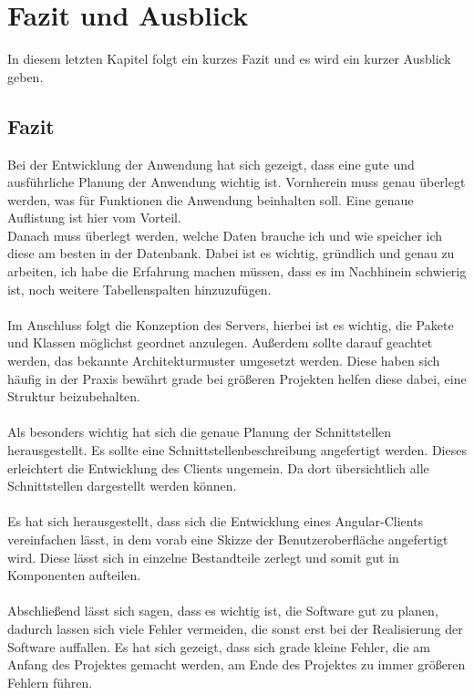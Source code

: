 \section{Fazit und Ausblick}\label{zusammenfassung}

In diesem letzten Kapitel folgt ein kurzes Fazit und es wird ein kurzer Ausblick geben.

\subsection{Fazit}\label{fazit}

Bei der Entwicklung der Anwendung hat sich gezeigt, dass eine gute und ausführliche Planung der Anwendung wichtig ist. Vornherein muss genau überlegt werden, was für Funktionen die Anwendung beinhalten soll. Eine genaue Auflistung ist hier vom Vorteil.
\\
Danach muss überlegt werden, welche Daten brauche ich und wie speicher ich diese am besten in der Datenbank. Dabei ist es wichtig, gründlich und genau zu arbeiten, ich habe die Erfahrung machen müssen, dass es im Nachhinein schwierig ist, noch weitere Tabellenspalten hinzuzufügen.
\\
\\
Im Anschluss folgt die Konzeption des Servers, hierbei ist es wichtig, die Pakete und Klassen möglichst geordnet anzulegen. Außerdem sollte darauf geachtet werden, das bekannte Architekturmuster umgesetzt werden. Diese haben sich häufig in der Praxis bewährt grade bei größeren Projekten helfen diese dabei, eine Struktur beizubehalten.
\\
\\
Als besonders wichtig hat sich die genaue Planung der Schnittstellen herausgestellt. Es sollte eine Schnittstellenbeschreibung angefertigt werden. Dieses erleichtert die Entwicklung des Clients ungemein. Da dort übersichtlich alle Schnittstellen dargestellt werden können.
\\
\\
Es hat sich herausgestellt, dass sich die Entwicklung eines Angular-Clients vereinfachen lässt, in dem vorab eine Skizze der Benutzeroberfläche angefertigt wird. Diese lässt sich in einzelne Bestandteile zerlegt und somit gut in Komponenten aufteilen.
\\
\\
Abschließend lässt sich sagen, dass es wichtig ist, die Software gut zu planen, dadurch lassen sich viele Fehler vermeiden, die sonst erst bei der Realisierung der Software auffallen.
Es hat sich gezeigt, dass sich grade kleine Fehler, die am Anfang des Projektes gemacht werden, am Ende des Projektes zu immer größeren Fehlern führen.

